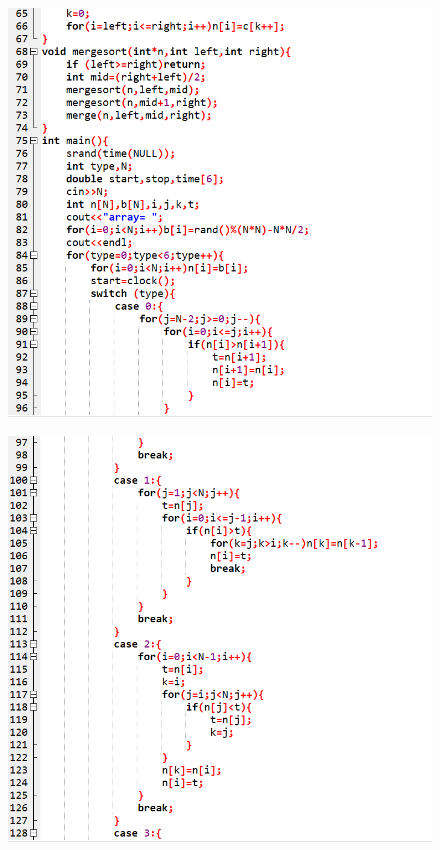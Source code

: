 \documentclass[12pt]{article}
\begin{document}
\begin{figure}[H]
\centering
\includegraphics[scale=0.6]{P5.png}
\end{figure}
\begin{figure}[H]
\centering
\includegraphics[scale=0.6]{P6.png}
\end{figure}
\end{document}

